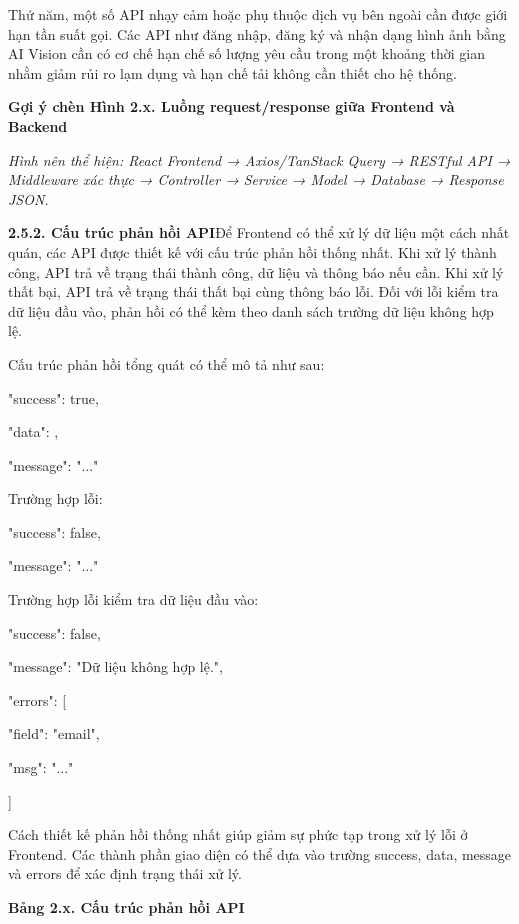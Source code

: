 Thứ năm, một số API nhạy cảm hoặc phụ thuộc dịch vụ bên ngoài cần được giới hạn tần suất gọi. Các API như đăng nhập, đăng ký và nhận dạng hình ảnh bằng AI Vision cần có cơ chế hạn chế số lượng yêu cầu trong một khoảng thời gian nhằm giảm rủi ro lạm dụng và hạn chế tải không cần thiết cho hệ thống.

\textbf{Gợi ý chèn Hình 2.x. Luồng request/response giữa Frontend và Backend}

\textit{Hình nên thể hiện: React Frontend → Axios/TanStack Query → RESTful API → Middleware xác thực → Controller → Service → Model → Database → Response JSON.}

\textbf{2.5.2. Cấu trúc phản hồi API}Để Frontend có thể xử lý dữ liệu một cách nhất quán, các API được thiết kế với cấu trúc phản hồi thống nhất. Khi xử lý thành công, API trả về trạng thái thành công, dữ liệu và thông báo nếu cần. Khi xử lý thất bại, API trả về trạng thái thất bại cùng thông báo lỗi. Đối với lỗi kiểm tra dữ liệu đầu vào, phản hồi có thể kèm theo danh sách trường dữ liệu không hợp lệ.

Cấu trúc phản hồi tổng quát có thể mô tả như sau:

{

  "success": true,

  "data": {},

  "message": "..."

}

Trường hợp lỗi:

{

  "success": false,

  "message": "..."

}

Trường hợp lỗi kiểm tra dữ liệu đầu vào:

{

  "success": false,

  "message": "Dữ liệu không hợp lệ.",

  "errors": [

    {

      "field": "email",

      "msg": "..."

    }

  ]

}

Cách thiết kế phản hồi thống nhất giúp giảm sự phức tạp trong xử lý lỗi ở Frontend. Các thành phần giao diện có thể dựa vào trường success, data, message và errors để xác định trạng thái xử lý.

\textbf{Bảng 2.x. Cấu trúc phản hồi API}

